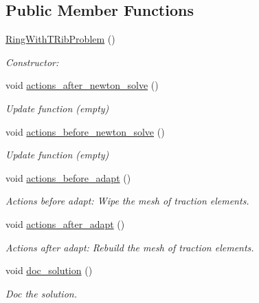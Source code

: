 \subsection*{Public Member Functions}
\begin{DoxyCompactItemize}
\item 
\hyperlink{classRingWithTRibProblem_ad0313aac3c0cdb87e753ba474a4e334f}{Ring\+With\+T\+Rib\+Problem} ()
\begin{DoxyCompactList}\small\item\em Constructor\+: \end{DoxyCompactList}\item 
void \hyperlink{classRingWithTRibProblem_a5d9f7b05cc71c02275f6c3c1a465fd20}{actions\+\_\+after\+\_\+newton\+\_\+solve} ()
\begin{DoxyCompactList}\small\item\em Update function (empty) \end{DoxyCompactList}\item 
void \hyperlink{classRingWithTRibProblem_aa74a20d5bd6d7f16eb00080734dde0d1}{actions\+\_\+before\+\_\+newton\+\_\+solve} ()
\begin{DoxyCompactList}\small\item\em Update function (empty) \end{DoxyCompactList}\item 
void \hyperlink{classRingWithTRibProblem_a7a170199d58390ae43a044294bfc7ac5}{actions\+\_\+before\+\_\+adapt} ()
\begin{DoxyCompactList}\small\item\em Actions before adapt\+: Wipe the mesh of traction elements. \end{DoxyCompactList}\item 
void \hyperlink{classRingWithTRibProblem_a8749aaf1e46d802c210b51e07093505b}{actions\+\_\+after\+\_\+adapt} ()
\begin{DoxyCompactList}\small\item\em Actions after adapt\+: Rebuild the mesh of traction elements. \end{DoxyCompactList}\item 
void \hyperlink{classRingWithTRibProblem_a43b70b125f467aa5bb9c74d08f193aa5}{doc\+\_\+solution} ()
\begin{DoxyCompactList}\small\item\em Doc the solution. \end{DoxyCompactList}\end{DoxyCompactItemize}
